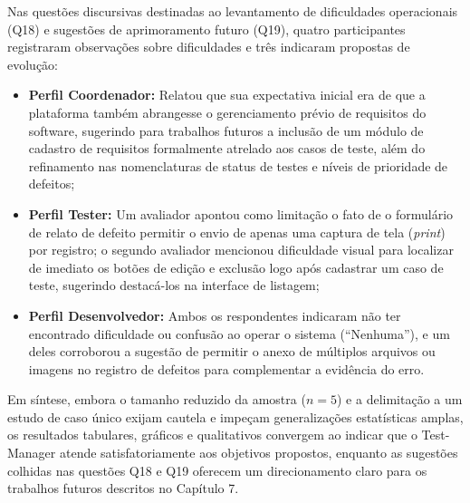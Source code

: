 Nas questões discursivas destinadas ao levantamento de dificuldades operacionais (Q18) e sugestões de aprimoramento futuro (Q19), quatro participantes registraram observações sobre dificuldades e três indicaram propostas de evolução:
\begin{itemize}
    \item \textbf{Perfil Coordenador:} Relatou que sua expectativa inicial era de que a plataforma também abrangesse o gerenciamento prévio de requisitos do software, sugerindo para trabalhos futuros a inclusão de um módulo de cadastro de requisitos formalmente atrelado aos casos de teste, além do refinamento nas nomenclaturas de status de testes e níveis de prioridade de defeitos;
    \item \textbf{Perfil Tester:} Um avaliador apontou como limitação o fato de o formulário de relato de defeito permitir o envio de apenas uma captura de tela (\textit{print}) por registro; o segundo avaliador mencionou dificuldade visual para localizar de imediato os botões de edição e exclusão logo após cadastrar um caso de teste, sugerindo destacá-los na interface de listagem;
    \item \textbf{Perfil Desenvolvedor:} Ambos os respondentes indicaram não ter encontrado dificuldade ou confusão ao operar o sistema (``Nenhuma''), e um deles corroborou a sugestão de permitir o anexo de múltiplos arquivos ou imagens no registro de defeitos para complementar a evidência do erro.
\end{itemize}

Em síntese, embora o tamanho reduzido da amostra ($n = 5$) e a delimitação a um estudo de caso único exijam cautela e impeçam generalizações estatísticas amplas, os resultados tabulares, gráficos e qualitativos convergem ao indicar que o Test-Manager atende satisfatoriamente aos objetivos propostos, enquanto as sugestões colhidas nas questões Q18 e Q19 oferecem um direcionamento claro para os trabalhos futuros descritos no Capítulo 7.